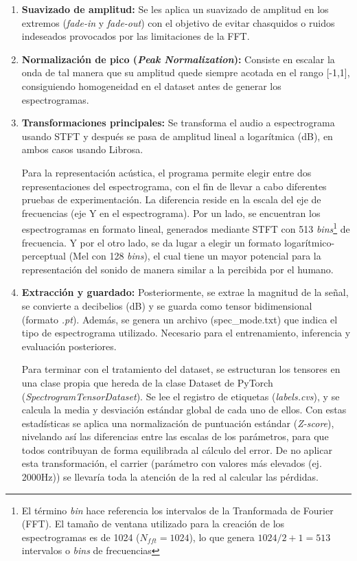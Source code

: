 \begin{enumerate}
    \item \textbf{Suavizado de amplitud: }Se les aplica un suavizado de amplitud en los extremos (\textit{fade-in} y \textit{fade-out}) con el objetivo de 
evitar chasquidos o ruidos indeseados provocados por las limitaciones de la FFT. 
\item \textbf{Normalización de pico (\textit{Peak Normalization}): } 
Consiste en escalar la onda de tal manera que su amplitud quede siempre acotada en el rango [-1,1], consiguiendo homogeneidad en el dataset antes de generar los espectrogramas.
\item \textbf{Transformaciones principales: }Se transforma el audio a espectrograma usando STFT y después se pasa de amplitud lineal a logarítmica (dB), en ambos casos usando Librosa. 

Para la representación acústica, el programa permite elegir entre dos representaciones del espectrograma, con el fin de llevar a cabo diferentes pruebas de experimentación.
La diferencia reside en la escala del eje de frecuencias (eje Y en el espectrograma). Por un lado, se encuentran 
los espectrogramas en formato lineal, generados mediante STFT con 513  \textit{bins}\footnote{El término \textit{bin} hace referencia los intervalos de la Tranformada de Fourier (FFT). 
El tamaño de ventana utilizado para la creación de los espectrogramas es de 1024 ($N_{fft} = 1024$), lo que genera
$1024 / 2 + 1 = 513$ intervalos o \textit{bins} de frecuencias} de frecuencia. Y por el otro lado, 
se da lugar a elegir un formato logarítmico-perceptual (Mel con 128 \textit{bins}), el cual tiene un mayor potencial para
la representación del sonido de manera similar a la percibida por el humano.

\item \textbf{Extracción y guardado: }Posteriormente, se extrae la magnitud de la señal, se convierte a decibelios (dB) y se guarda como tensor bidimensional (formato \textit{.pt}). Además,
se genera un archivo (spec\_mode.txt) que indica el tipo de espectrograma utilizado. Necesario para el entrenamiento, inferencia y evaluación posteriores.

Para terminar con el tratamiento del dataset, se estructuran los tensores en una clase propia que hereda de la clase Dataset de PyTorch
(\textit{SpectrogramTensorDataset}). Se lee el registro de etiquetas (\textit{labels.cvs}), y se calcula la media y desviación estándar global de cada uno de ellos. Con estas estadísticas
se aplica una normalización de puntuación estándar (\textit{Z-score}), nivelando así las diferencias entre las escalas
de los parámetros, para que todos contribuyan de forma equilibrada al cálculo del error. De no aplicar esta transformación,
el carrier (parámetro con valores más elevados (ej. 2000Hz)) se llevaría toda la atención de la red al calcular las pérdidas.


\end{enumerate}
